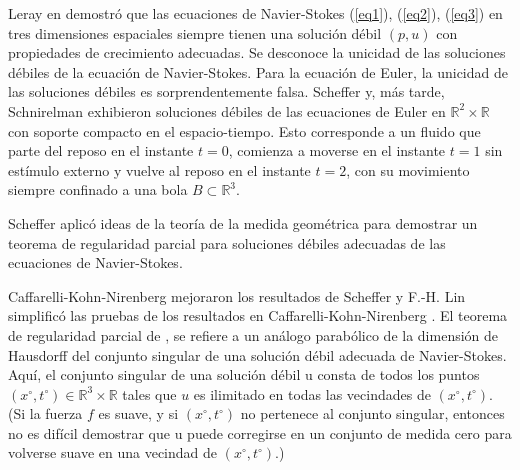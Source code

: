 Leray en \cite{leray1934mouvement} demostró que las ecuaciones de Navier-Stokes (\ref{eq1}), (\ref{eq2}), (\ref{eq3}) en tres dimensiones espaciales siempre tienen una solución débil $(p, u)$ con propiedades de crecimiento adecuadas. Se desconoce la unicidad de las soluciones débiles de la ecuación de Navier-Stokes. Para la ecuación de Euler, la unicidad de las soluciones débiles es sorprendentemente falsa. Scheffer \cite{scheffer1993inviscid} y, más tarde, Schnirelman \cite{shnirelman1997nonuniqueness} exhibieron soluciones débiles de las ecuaciones de Euler en $\mathbb{R}^2 \times \mathbb{R}$ con soporte compacto en el espacio-tiempo. Esto corresponde a un fluido que parte del reposo en el instante $t = 0$, comienza a moverse en el instante $t = 1$ sin estímulo externo y vuelve al reposo en el instante $t = 2$, con su movimiento siempre confinado a una bola $B \subset  \mathbb{R}^3$.

Scheffer \cite{scheffer2006turbulence} aplicó ideas de la teoría de la medida geométrica para demostrar un teorema de regularidad parcial para soluciones débiles adecuadas de las ecuaciones de Navier-Stokes.

Caffarelli-Kohn-Nirenberg \cite{caffarelli1982partial} mejoraron los resultados de Scheffer y F.-H. Lin \cite{lin1998new} simplificó las pruebas de los resultados en Caffarelli-Kohn-Nirenberg \cite{caffarelli1982partial}. El teorema de regularidad parcial de \cite{caffarelli1982partial}, \cite{lin1998new} se refiere a un análogo parabólico de la dimensión de Hausdorff del conjunto singular de una solución débil adecuada de Navier-Stokes. Aquí, el conjunto singular de una solución débil u consta de todos los puntos $(x^{\circ}, t^{\circ}) \in \mathbb{R}^3 \times \mathbb{R}$ tales que $u$ es ilimitado en todas las vecindades de $(x^{\circ}, t^{\circ})$. (Si la fuerza $f$ es suave, y si $(x^{\circ}, t^{\circ})$ no pertenece al conjunto singular, entonces no es difícil demostrar que u puede corregirse en un conjunto de medida cero para volverse suave en una vecindad de $(x^{\circ}, t^{\circ})$.)

